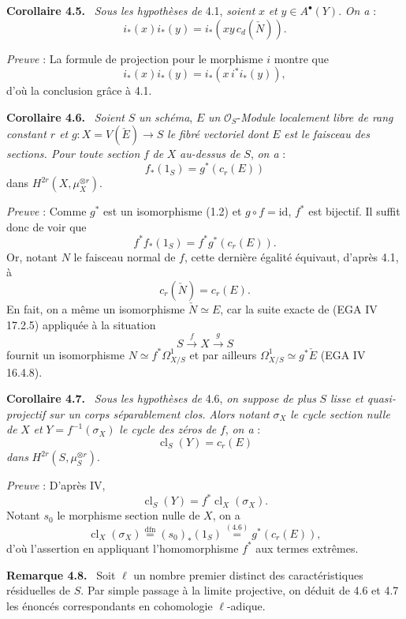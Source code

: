 \documentclass[11pt]{article}
\newenvironment{statement}[1]{\par\medskip\noindent\textbf{#1.}\ }{\par\medskip}
\providecommand{\cl}{\operatorname{cl}}
\providecommand{\cl}{\operatorname{cl}}
\providecommand{\cl}{\operatorname{cl}}
\begin{document}
\begin{statement}{Corollaire 4.5}
\emph{Sous les hypothèses de} 4.1, \emph{soient} $x$ \emph{et} $y\in A^\bullet(Y)$. \emph{On a} :
\[
i_*(x)i_*(y)=i_*(xy\,c_d(\check N)).
\]
\end{statement}

\emph{Preuve} : La formule de projection pour le morphisme $i$ montre que
\[
i_*(x)i_*(y)=i_*(x\,i^*i_*(y)),
\]
d'où la conclusion grâce à 4.1.

\begin{statement}{Corollaire 4.6}
\emph{Soient} $S$ \emph{un} \emph{schéma}, $E$ \emph{un} $\mathcal O_S$-\emph{Module localement libre de rang constant $r$ et} $g:X=V(\check E)\to S$ \emph{le fibré vectoriel dont} $E$ \emph{est le faisceau des sections. Pour toute section} $f$ \emph{de} $X$ \emph{au-dessus de} $S$, \emph{on a} :
\[
f_*(1_S)=g^*(c_r(E))
\]
dans $H^{2r}(X,\mu_X^{\otimes r})$.
\end{statement}

\emph{Preuve} : Comme $g^*$ est un isomorphisme (1.2) et $g\circ f=\mathrm{id}$, $f^*$ est bijectif. Il suffit donc de voir que
\[
f^*f_*(1_S)=f^*g^*(c_r(E)).
\]
Or, notant $N$ le faisceau normal de $f$, cette dernière égalité équivaut, d'après 4.1, à
\[
c_r(\check N)=c_r(E).
\]
En fait, on a même un isomorphisme $\check N\simeq E$, car la suite exacte de (EGA IV 17.2.5) appliquée à la situation
\[
S\xrightarrow{f} X\xrightarrow{g} S
\]
fournit un isomorphisme $N\simeq f^*\Omega^1_{X/S}$ et par ailleurs $\Omega^1_{X/S}\simeq g^*\check E$ (EGA IV 16.4.8).

\begin{statement}{Corollaire 4.7}
\emph{Sous les hypothèses de} 4.6, \emph{on suppose de plus} $S$ \emph{lisse et quasi-projectif sur un corps séparablement clos.} \emph{Alors notant} $\sigma_X$ \emph{le cycle section nulle de} $X$ \emph{et} $Y=f^{-1}(\sigma_X)$ \emph{le cycle des zéros de} $f$, \emph{on a} :
\[
\cl_S(Y)=c_r(E)
\]
\emph{dans} $H^{2r}(S,\mu_S^{\otimes r})$.
\end{statement}

\emph{Preuve} : D'après IV,
\[
\cl_S(Y)=f^*\cl_X(\sigma_X).
\]
Notant $s_0$ le morphisme section nulle de $X$, on a
\[
\cl_X(\sigma_X)\stackrel{\mathrm{dfn}}{=}(s_0)_*(1_S)\stackrel{(4.6)}{=}g^*(c_r(E)),
\]
d'où l'assertion en appliquant l'homomorphisme $f^*$ aux termes extrêmes.

\begin{statement}{Remarque 4.8}
Soit $\ell$ un nombre premier distinct des caractéristiques résiduelles de $S$. Par simple passage à la limite projective, on déduit de 4.6 et 4.7 les énoncés correspondants en cohomologie $\ell$-adique.
\end{statement}
\end{document}
